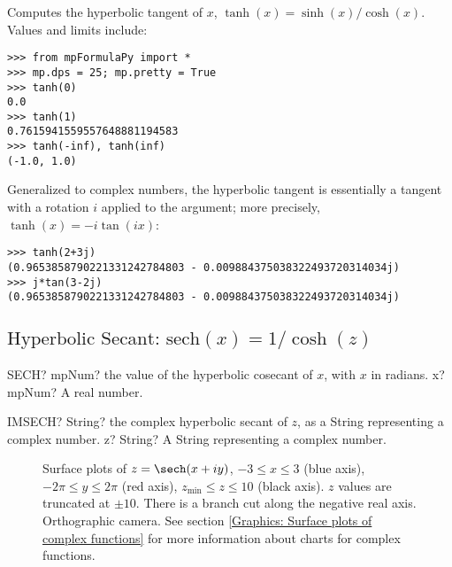 Computes the hyperbolic tangent of $x$, $\tanh(x) = \sinh(x)/\cosh(x)$. Values and limits include:

\begin{lstlisting}
>>> from mpFormulaPy import *
>>> mp.dps = 25; mp.pretty = True
>>> tanh(0)
0.0
>>> tanh(1)
0.7615941559557648881194583
>>> tanh(-inf), tanh(inf)
(-1.0, 1.0)
\end{lstlisting}

Generalized to complex numbers, the hyperbolic tangent is essentially a tangent with a rotation $i$ applied to the argument; more precisely, $\tanh(x)=-i \tan(ix)$:

\begin{lstlisting}
>>> tanh(2+3j)
(0.9653858790221331242784803 - 0.009884375038322493720314034j)
>>> j*tan(3-2j)
(0.9653858790221331242784803 - 0.009884375038322493720314034j)
\end{lstlisting}



\newpage
\subsection{\texorpdfstring{$\text{Hyperbolic Secant: sech}(x) = 1/\cosh(z)$}{sech}}

\begin{mpFunctionsExtract}
	\mpWorksheetFunctionOneNotImplemented
	{SECH? mpNum? the value of the hyperbolic cosecant of $x$, with $x$ in radians.}
	{x? mpNum? A real number.}
\end{mpFunctionsExtract}


\vspace{0.6cm}
\begin{mpFunctionsExtract}
	\mpWorksheetFunctionOneNotImplemented
	{IMSECH? String? the complex hyperbolic secant of $z$, as a String representing a complex number.}
	{z? String? A String representing a complex number.}
\end{mpFunctionsExtract}


\begin{figure}[ht]%
	\centering
	\qquad
	\caption[Complex Hyperbolic Secant]{Surface plots of $z = \sech(x + iy)$, $-3 \leq x \leq 3$ (blue axis), $-2 \pi \leq y \leq 2\pi$ (red axis), $z_{\text{min}} \leq z \leq 10$ (black axis). $z$ values are truncated at $\pm 10$. There is a branch cut along the negative real axis. Orthographic camera. See section \ref{Graphics: Surface plots of complex functions} for more information about charts for complex functions.} 
	\label{fig:Complex Hyperbolic Secant}%
\end{figure}


